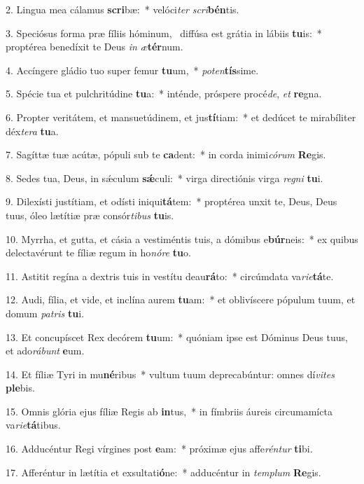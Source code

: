 2. Lingua mea cálamus \textbf{scri}bæ:~*  velóci\textit{ter} \textit{scri}\textbf{bén}tis.\

3. Speciósus forma præ fíliis hóminum, \dag\  diffúsa est grátia in lábiis \textbf{tu}is:~*  proptérea benedíxit te Deus \textit{in} \textit{æ}\textbf{tér}num.\

4. Accíngere gládio tuo super femur \textbf{tu}um,~*  \textit{pot}\textit{en}\textbf{tís}sime.\

5. Spécie tua et pulchritúdine \textbf{tu}a:~*  inténde, próspere procé\textit{de}, \textit{et} \textbf{re}gna.\

6. Propter veritátem, et mansuetúdinem, et jus\textbf{tí}tiam:~*  et dedúcet te mirabíliter déx\textit{te}\textit{ra} \textbf{tu}a.\

7. Sagíttæ tuæ acútæ, pópuli sub te \textbf{ca}dent:~*  in corda inimi\textit{có}\textit{rum} \textbf{Re}gis.\

8. Sedes tua, Deus, in sǽculum \textbf{sǽ}culi:~*  virga directiónis virga \textit{re}\textit{gni} \textbf{tu}i.\

9. Dilexísti justítiam, et odísti iniqui\textbf{tá}tem:~*  proptérea unxit te, Deus, Deus tuus, óleo lætítiæ præ consór\textit{ti}\textit{bus} \textbf{tu}is.\

10. Myrrha, et gutta, et cásia a vestiméntis tuis, a dómibus e\textbf{búr}neis:~*  ex quibus delectavérunt te fíliæ regum in ho\textit{nó}\textit{re} \textbf{tu}o.\

11. Astitit regína a dextris tuis in vestítu deau\textbf{rá}to:~*  circúmdata va\textit{ri}\textit{e}\textbf{tá}te.\

12. Audi, fília, et vide, et inclína aurem \textbf{tu}am:~*  et oblivíscere pópulum tuum, et domum \textit{pa}\textit{tris} \textbf{tu}i.\

13. Et concupíscet Rex decórem \textbf{tu}um:~*  quóniam ipse est Dóminus Deus tuus, et ado\textit{rá}\textit{bunt} \textbf{e}um.\

14. Et fíliæ Tyri in mu\textbf{né}ribus~*  vultum tuum deprecabúntur: omnes dí\textit{vi}\textit{tes} \textbf{ple}bis.\

15. Omnis glória ejus fíliæ Regis ab \textbf{in}tus,~*  in fímbriis áureis circumamícta va\textit{ri}\textit{e}\textbf{tá}tibus.\

16. Adducéntur Regi vírgines post \textbf{e}am:~*  próximæ ejus affe\textit{rén}\textit{tur} \textbf{ti}bi.\

17. Afferéntur in lætítia et exsultati\textbf{ó}ne:~*  adducéntur in \textit{tem}\textit{plum} \textbf{Re}gis.\

